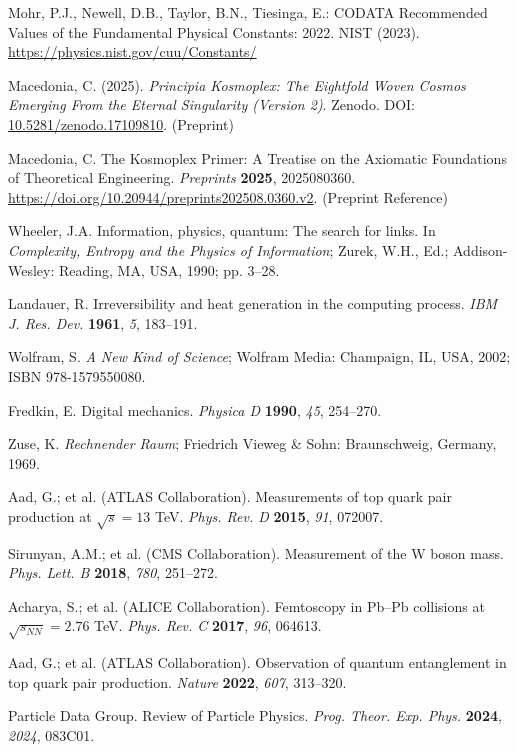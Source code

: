 \documentclass[pdflatex,sn-mathphys-num]{sn-jnl}
\theoremstyle{thmstyleone}
\theoremstyle{thmstyletwo}
\theoremstyle{thmstylethree}
\begin{document}
\pagebreak
\begin{thebibliography}{99}

Mohr, P.J., Newell, D.B., Taylor, B.N., Tiesinga, E.:
CODATA Recommended Values of the Fundamental Physical Constants: 2022.
NIST (2023). \url{https://physics.nist.gov/cuu/Constants/}

Macedonia, C. (2025).
\emph{Principia Kosmoplex: The Eightfold Woven Cosmos Emerging From the Eternal Singularity (Version 2)}. Zenodo.  DOI: \href{https://doi.org/10.5281/zenodo.17109810}{10.5281/zenodo.17109810}. (Preprint)


Macedonia, C. The Kosmoplex Primer: A Treatise on the Axiomatic Foundations of Theoretical Engineering. \textit{Preprints} \textbf{2025}, 2025080360. \href{https://doi.org/10.20944/preprints202508.0360.v2}{https://doi.org/10.20944/preprints202508.0360.v2}. (Preprint Reference)

Wheeler, J.A. Information, physics, quantum: The search for links. In \textit{Complexity, Entropy and the Physics of Information}; Zurek, W.H., Ed.; Addison-Wesley: Reading, MA, USA, 1990; pp. 3--28.

Landauer, R. Irreversibility and heat generation in the computing process. \textit{IBM J. Res. Dev.} \textbf{1961}, \textit{5}, 183--191.

Wolfram, S. \textit{A New Kind of Science}; Wolfram Media: Champaign, IL, USA, 2002; ISBN 978-1579550080.

Fredkin, E. Digital mechanics. \textit{Physica D} \textbf{1990}, \textit{45}, 254--270.

Zuse, K. \textit{Rechnender Raum}; Friedrich Vieweg \& Sohn: Braunschweig, Germany, 1969.

Aad, G.; et al. (ATLAS Collaboration). Measurements of top quark pair production at $\sqrt{s} = 13$ TeV. \textit{Phys. Rev. D} \textbf{2015}, \textit{91}, 072007.

Sirunyan, A.M.; et al. (CMS Collaboration). Measurement of the W boson mass. \textit{Phys. Lett. B} \textbf{2018}, \textit{780}, 251--272.

Acharya, S.; et al. (ALICE Collaboration). Femtoscopy in Pb--Pb collisions at $\sqrt{s_{NN}} = 2.76$ TeV. \textit{Phys. Rev. C} \textbf{2017}, \textit{96}, 064613.

Aad, G.; et al. (ATLAS Collaboration). Observation of quantum entanglement in top quark pair production. \textit{Nature} \textbf{2022}, \textit{607}, 313--320.

Particle Data Group. Review of Particle Physics. \textit{Prog. Theor. Exp. Phys.} \textbf{2024}, \textit{2024}, 083C01.

\end{thebibliography}
\end{document}
